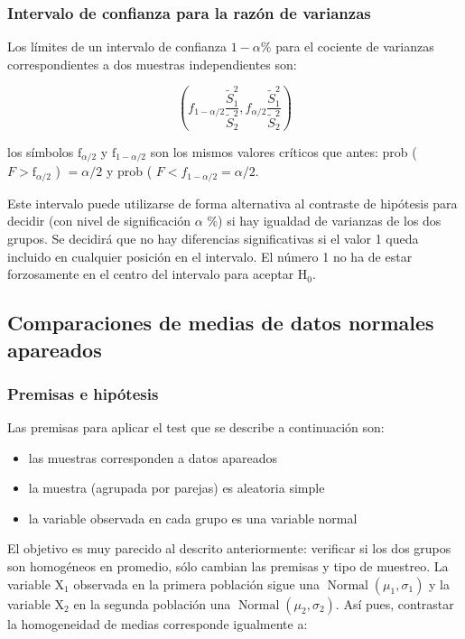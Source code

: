\documentclass[
]{article}
\providecommand{\tightlist}{%
  \setlength{\itemsep}{0pt}\setlength{\parskip}{0pt}}
\begin{document}
\subsubsection{Intervalo de confianza para la razón de varianzas}\label{intervalo-de-confianza-para-la-razuxf3n-de-varianzas}

Los límites de un intervalo de confianza \(1-\alpha \%\) para el cociente de varianzas correspondientes a dos muestras independientes son:

\[
\left(f_{1-\alpha / 2} \frac{\widetilde{S}_{1}^{2}}{\widetilde{S}_{2}^{2}}, f_{\alpha / 2} \frac{\widetilde{S}_{1}^{2}}{\widetilde{S}_{2}^{2}}\right)
\]

los símbolos \(\mathrm{f}_{\alpha / 2}\) y \(\mathrm{f}_{1-\alpha / 2}\) son los mismos valores críticos que antes: prob ( \(F>\mathrm{f}_{\alpha / 2}\) ) \(=\alpha / 2\) y prob ( \(F< f_{1-\alpha / 2}=\alpha / 2\).

Este intervalo puede utilizarse de forma alternativa al contraste de hipótesis para decidir (con nivel de significación \(\alpha\) \%) si hay igualdad de varianzas de los dos grupos. Se decidirá que no hay diferencias significativas si el valor 1 queda incluido en cualquier posición en el intervalo. El número 1 no ha de estar forzosamente en el centro del intervalo para aceptar \(\mathrm{H}_{0}\).

\subsection{Comparaciones de medias de datos normales apareados}\label{comparaciones-de-medias-de-datos-normales-apareados}

\subsubsection{Premisas e hipótesis}\label{premisas-e-hipuxf3tesis}

Las premisas para aplicar el test que se describe a continuación son:

\begin{itemize}
\tightlist
\item
  las muestras corresponden a datos apareados
\item
  la muestra (agrupada por parejas) es aleatoria simple
\item
  la variable observada en cada grupo es una variable normal
\end{itemize}

El objetivo es muy parecido al descrito anteriormente: verificar si los dos grupos son homogéneos en promedio, sólo cambian las premisas y tipo de muestreo. La variable \(\mathrm{X}_{1}\) observada en la primera población sigue una \(\operatorname{Normal}\left(\mu_{1}, \sigma_{1}\right)\) y la variable \(\mathrm{X}_{2}\) en la segunda población una \(\operatorname{Normal}\left(\mu_{2}, \sigma_{2}\right)\). Así pues, contrastar la homogeneidad de medias corresponde igualmente a:
\end{document}
